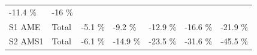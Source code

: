 \documentclass[]{article}
\begin{document}
\begin{longtable}[]{@{}lllllll@{}}
\begin{minipage}[t]{0.11\columnwidth}
-11.4 \%\strut
\end{minipage} & \begin{minipage}[t]{0.11\columnwidth}\raggedright\strut
-16 \%\strut
\end{minipage}\tabularnewline
\begin{minipage}[t]{0.14\columnwidth}\raggedright\strut
S1 AME\strut
\end{minipage} & \begin{minipage}[t]{0.13\columnwidth}\raggedright\strut
Total\strut
\end{minipage} & \begin{minipage}[t]{0.11\columnwidth}\raggedright\strut
-5.1 \%\strut
\end{minipage} & \begin{minipage}[t]{0.11\columnwidth}\raggedright\strut
-9.2 \%\strut
\end{minipage} & \begin{minipage}[t]{0.11\columnwidth}\raggedright\strut
-12.9 \%\strut
\end{minipage} & \begin{minipage}[t]{0.11\columnwidth}\raggedright\strut
-16.6 \%\strut
\end{minipage} & \begin{minipage}[t]{0.11\columnwidth}\raggedright\strut
-21.9 \%\strut
\end{minipage}\tabularnewline
\begin{minipage}[t]{0.14\columnwidth}\raggedright\strut
S2 AMS1\strut
\end{minipage} & \begin{minipage}[t]{0.13\columnwidth}\raggedright\strut
Total\strut
\end{minipage} & \begin{minipage}[t]{0.11\columnwidth}\raggedright\strut
-6.1 \%\strut
\end{minipage} & \begin{minipage}[t]{0.11\columnwidth}\raggedright\strut
-14.9 \%\strut
\end{minipage} & \begin{minipage}[t]{0.11\columnwidth}\raggedright\strut
-23.5 \%\strut
\end{minipage} & \begin{minipage}[t]{0.11\columnwidth}\raggedright\strut
-31.6 \%\strut
\end{minipage} & \begin{minipage}[t]{0.11\columnwidth}\raggedright\strut
-45.5 \%\strut
\end{minipage}\tabularnewline

\end{longtable}
\end{document}
